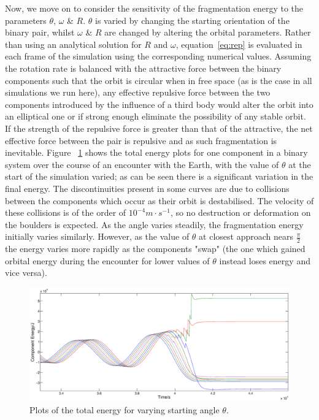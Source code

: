 \documentclass[letterpaper, preprint, paper,11pt]{AAS}	%
\begin{document}
Now, we move on to consider the sensitivity of the fragmentation energy to the parameters $\theta$, $\omega$ \& $R$. $\theta$ is varied by changing the starting orientation of the binary pair, whilst $\omega$ \& $R$ are changed by altering the orbital parameters. Rather than using an analytical solution for $R$ and $\omega$, equation~\ref{eq:rep} is evaluated in each frame of the simulation using the corresponding numerical values. Assuming the rotation rate is balanced with the attractive force between the binary components such that the orbit is circular when in free space (as is the case in all simulations we run here), any effective repulsive force between the two components introduced by the influence of a third body would alter the orbit into an elliptical one or if strong enough eliminate the possibility of any stable orbit. If the strength of the repulsive force is greater than that of the attractive, the net effective force between the pair is repulsive and as such fragmentation is inevitable. Figure ~\ref{fig:phase} shows the total energy plots for one component in a binary system over the course of an encounter with the Earth, with the value of $\theta$ at the start of the simulation varied; as can be seen there is a significant variation in the final energy. The discontinuities present in some curves are due to collisions between the components which occur as their orbit is destabilised. The velocity of these collisions is of the order of $10^{-4}m\cdot s^{-1}$,  so no destruction or deformation on the boulders is expected. As the angle varies steadily, the fragmentation energy initially varies similarly. However, as the value of $\theta$ at closest approach nears $\frac{\pi}{2}$ the energy varies more rapidly as the components "swap" (the one which gained orbital energy during the encounter for lower values of $\theta$ instead loses energy and vice versa).
 \begin{figure}[H]
\centering
\centerline{\includegraphics[width=1.2\textwidth]{phasing_2.eps}} 
\caption{Plots of the total energy for varying starting angle $\theta$.} 
\label{fig:phase}
\end{figure} 
\end{document}
